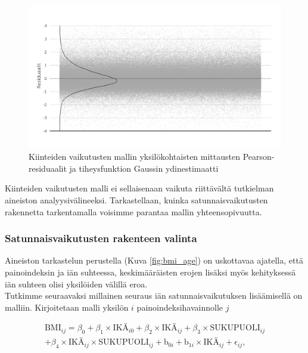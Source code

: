 \documentclass[finnish]{docopts}
\begin{document}
\begin{figure}[H]
\centering
  \includegraphics[scale=0.8]{kuvaajat/lme_residuaalit.png}
  \caption{Kiinteiden vaikutusten mallin yksilökohtaisten mittausten Pearson-residuaalit ja tiheysfunktion Gaussin ydinestimaatti}
  \label{fig:lme1_resid}
\end{figure}

Kiinteiden vaikutusten malli ei sellaisenaan vaikuta riittävältä tutkielman aineiston analyysivälineeksi. Tarkastellaan, kuinka satunnaisvaikutusten rakennetta tarkentamalla voisimme parantaa mallin yhteensopivuutta.\\

\subsubsection{Satunnaisvaikutusten rakenteen valinta}
\label{ssb:satunnaisrakenneval}

Aineiston tarkastelun perustella (Kuva \ref{fig:bmi_age}) on uskottavaa ajatella, että painoindeksin ja iän suhteessa, keskimääräisten erojen lisäksi myös kehityksessä iän suhteen olisi yksilöiden välillä eroa. \\

Tutkimme seuraavaksi millainen seuraus iän satunnaisvaikutuksen lisäämisellä on malliin. Kirjoitetaan malli yksilön $i$ painoindeksihavainnolle $j$

\begin{equation}
\begin{split}
 \text{BMI}_{ij} = \beta_0 + \beta_1 \times \text{IKÄ}_{i0} + \beta_2 \times \text{IKÄ}_{ij} + \beta_3 \times \text{SUKUPUOLI}_{ij} \\
+ \beta_4 \times \text{IKÄ}_{ij} \times \text{SUKUPUOLI}_{ij} + \text{b}_{0i} + \text{b}_{1i} \times \text{IKÄ}_{ij} + \epsilon_{ij},
\label{eq:lme2}
\end{split}
\end{equation}
\end{document}
